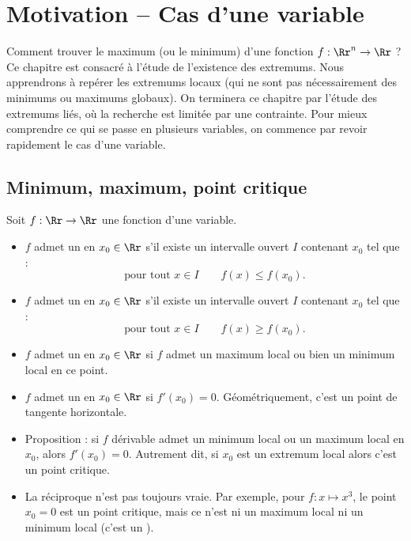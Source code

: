\documentclass[11pt, class=report,crop=false]{standalone}
\begin{document}

\newcommand{\grad}{\operatorname{grad}} %

\newcommand{\myscale}{1}

\section{Motivation -- Cas d'une variable}



Comment trouver le maximum (ou le minimum) d'une fonction $f : \Rr^n  \to \Rr$ ?
Ce chapitre est consacré à l'étude de l'existence des extremums.
Nous apprendrons à repérer les extremums locaux (qui ne sont pas nécessairement des minimums ou maximums globaux). 
On terminera ce chapitre par l'étude des \og{}extremums liés\fg{},
où la recherche est limitée par une contrainte.
Pour mieux comprendre ce qui se passe en plusieurs variables, on commence par revoir rapidement le cas d'une variable.

\subsection{Minimum, maximum, point critique}

Soit $f : \Rr \to \Rr$ une fonction d'une variable.
\begin{itemize}
      \item $f$ admet un  en $x_0 \in \Rr$ s'il existe un intervalle ouvert $I$ contenant $x_0$ tel que :
      $$\text{pour tout } x \in I \qquad f(x) \le f(x_0).$$
      
      \item $f$ admet un  en $x_0 \in \Rr$ s'il existe un intervalle ouvert $I$ contenant $x_0$ tel que :
$$\text{pour tout } x \in I \qquad f(x) \ge f(x_0).$$ 

      \item $f$ admet un  en $x_0 \in \Rr$ si $f$ admet un maximum local ou bien un minimum local en ce point.
      \item $f$ admet un  en $x_0 \in \Rr$ si $f'(x_0)=0$. Géométriquement, c'est un point de tangente horizontale.
      
      \item Proposition : si $f$ dérivable admet un minimum local ou un maximum local en $x_0$, alors $f'(x_0)=0$.
      Autrement dit, si $x_0$ est un extremum local alors c'est un point critique.
      
      \item La réciproque n'est pas toujours vraie. Par exemple, pour $f: x \mapsto x^3$, le point $x_0=0$ est un point critique, mais ce n'est ni un maximum local ni un minimum local (c'est un ).
      
   
\end{itemize}
\end{document}
